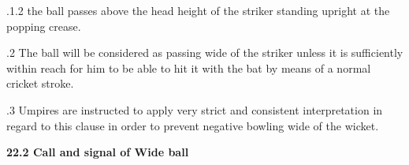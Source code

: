\documentclass[12pt]{article}
\begin{document}
\vspace{\baselineskip}
\begin{adjustwidth}{0.49in}{0.0in}
{\fontsize{9pt}{10.8pt}.1.2 \tabto{1.17in} the ball passes above the head height of the striker standing upright at the popping crease.\par}\par

\end{adjustwidth}


\vspace{\baselineskip}
\begin{adjustwidth}{0.5in}{0.22in}
{\fontsize{9pt}{10.8pt}.2 \tabto{0.49in} The ball will be considered as passing wide of the striker unless it is sufficiently within reach for him to be able to hit it with the bat by means of a normal cricket stroke.\par}\par

\end{adjustwidth}


\vspace{\baselineskip}
\begin{adjustwidth}{0.5in}{0.21in}
{\fontsize{9pt}{10.8pt}.3 \tabto{0.49in} Umpires are instructed to apply very strict and consistent interpretation in regard to this clause in order to prevent negative bowling wide of the wicket.\par}\par

\end{adjustwidth}


\vspace{\baselineskip}

\vspace{\baselineskip}

\vspace{\baselineskip}

\vspace{\baselineskip}

\vspace{\baselineskip}
\begin{Center}
{\fontsize{8pt}{9.6pt}\par}
\end{Center}\par


\vspace{\baselineskip}
{\fontsize{11pt}{13.2pt}\selectfont \textbf{22.2 \tabto{0.47in} Call and signal of Wide ball}\par}\par
\end{document}
